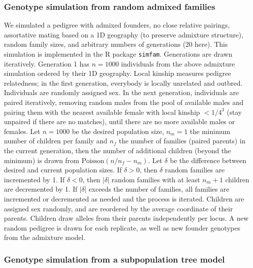 \documentclass[9pt,lineno]{elife}
\begin{document}
\subsubsection{Genotype simulation from random admixed families}

We simulated a pedigree with admixed founders, no close relative pairings, assortative mating based on a 1D geography (to preserve admixture structure), random family sizes, and arbitrary numbers of generations (20 here).
This simulation is implemented in the R package \texttt{simfam}.
Generations are drawn iteratively.
Generation 1 has $n=1000$ individuals from the above admixture simulation ordered by their 1D geography.
Local kinship measures pedigree relatedness; in the first generation, everybody is locally unrelated and outbred.
Individuals are randomly assigned sex.
In the next generation, individuals are paired iteratively, removing random males from the pool of available males and pairing them with the nearest available female with local kinship $< 1/4^3$ (stay unpaired if there are no matches), until there are no more available males or females.
Let $n=1000$ be the desired population size, $n_m=1$ the minimum number of children per family and $n_f$ the number of families (paired parents) in the current generation, then the number of additional children (beyond the minimum) is drawn from $\text{Poisson}(n/n_f - n_m)$.
Let $\delta$ be the difference between desired and current population sizes.
If $\delta > 0$, then $\delta$ random families are incremented by 1.
If $\delta < 0$, then $|\delta|$ random families with at least $n_m+1$ children are decremented by 1.
If $|\delta|$ exceeds the number of families, all families are incremented or decremented as needed and the process is iterated.
Children are assigned sex randomly, and are reordered by the average coordinate of their parents.
Children draw alleles from their parents independently per locus.
A new random pedigree is drawn for each replicate, as well as new founder genotypes from the admixture model.

\subsubsection{Genotype simulation from a subpopulation tree model}
\end{document}
